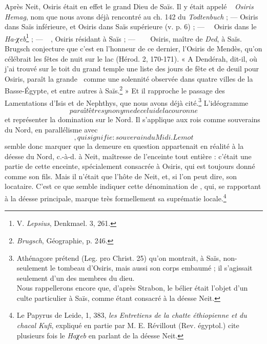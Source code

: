 \documentclass[letterpaper,twocolumn,openany,nodeprecatedcode]{dndbook}
\newcommand*\hieroAAAW{\raisebox{0.5ex}{}}
\newcommand*\hieroAAAX{}
\newcommand*\hieroAABC{\raisebox{0.5ex}{}}
\newcommand*\hieroAADV{\raisebox{0.5ex}{}}
\newcommand*\hieroAAEZ{}
\newcommand*\hieroAAFW{}
\newcommand*\hieroAAHK{}
\newcommand*\hieroAAHO{}
\newcommand*\hieroAAIL{}
\newcommand*\hieroAAIQ{}
\newcommand*\hieroAAJC{}
\newcommand*\hieroAAJE{}
\newcommand*\hieroAAJF{}
\newcommand*\hieroAAJG{}
\newcommand*\hieroAAJH{\raisebox{0.5ex}{}}
\newcommand*\hieroAAJI{}
\newcommand*\hieroAAJJ{}
\newcommand*\hieroAAJK{}
\newcommand*\hieroAAJL{}
\begin{document}
Après Neit, Osiris était en effet le grand Dieu de Saïs. Il y était appelé $\hieroAAJE\:\hieroAAEZ\:\hieroAAJF$ \emph{Osiris Hemag}, nom que nous avons déjà rencontré au ch. 142 du \emph{Todtenbuch} ; --- Osiris dans Saïs inférieure, et Osiris dans Saïs supérieure (v. p. 6) ; --- $\hieroAAJE\:\hieroAAHO\allowbreak\:\hieroAAHK\:\hieroAAJC$ Osiris dans le \emph{Ha-χeb}\footnote{V. \emph{Lepsius}, Denkmael. 3, 261.} ; --- $\hieroAAJG\:\hieroAAIQ\allowbreak\:\hieroAAJH\:\hieroAAAW$, Osiris résidant à Saïs ; --- $\hieroAAJG\:\hieroAABC\:\hieroAAJI\allowbreak\:\hieroAAJJ\:\hieroAADV\allowbreak\:\hieroAAJH\:\hieroAAAW$ Osiris, maître de \emph{Ded}, à Saïs. Brugsch conjecture que c'est en l'honneur de ce dernier, l'Osiris de Mendès, qu'on célébrait les fêtes de nuit sur le lac (Hérod. 2, 170-171). « A Dendérah, dit-il, où j'ai trouvé sur le toit du grand temple une liste des jours de fête et de deuil pour Osiris, paraît la grande $\hieroAAJK\:\hieroAAJL$ comme une solennité observée dans quatre villes de la Basse-Égypte, et entre autres à Saïs.\footnote{\emph{Brugsch}, Géographie, p. 246.} » Et il rapproche le passage des Lamentations d'Isis et de Nephthys, que nous avons déjà cité.\footnote{Athénagore prétend (Leg. pro Christ. 25) qu'on montrait, à Saïs, non-seulement le tombeau d'Osiris, mais aussi son corps embaumé ; il s'agissait seulement d'un des membres du dieu.\\\hspace*{5mm}Nous rappellerons encore que, d'après Strabon, le bélier était l'objet d'un culte particulier à Saïs, comme étant consacré à la déesse Neit.} L'idéogramme $\hieroAAJC$ paraît être synonyme de celui de la couronne $\hieroAAIL$ et représenter la domination sur le Nord. Il s'applique aux rois comme souverains du Nord, en parallélisme avec $\hieroAAAX$, qui signifie : souverain du Midi. Le mot $\hieroAAFW$ semble donc marquer que la demeure en question appartenait en réalité à la déesse du Nord, c.-à-d. à Neit, maîtresse de l'enceinte tout entière : c'était une partie de cette enceinte, spécialement consacrée à Osiris, qui est toujours donné comme son fils. Mais il n'était que l'hôte de Neit, et, si l'on peut dire, son locataire. C'est ce que semble indiquer cette dénomination de $\hieroAAFW$, qui, se rapportant à la déesse principale, marque très formellement sa suprématie locale.\footnote{Le Papyrus de Leide, 1, 383, \emph{les Entretiens de la chatte éthiopienne et du chacal Kufi}, expliqué en partie par M. E. Révillout (Rev. égyptol.) cite plusieurs fois le \emph{Haχeb} en parlant de la déesse Neit.}
\end{document}
